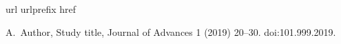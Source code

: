 \documentclass{article}
\begin{document}
\cite{bibkey1}


\begin{thebibliography}{1}
\expandafter\ifx\csname url\endcsname\relax
  \def\url#1{\texttt{#1}}\fi
\expandafter\ifx\csname urlprefix\endcsname\relax\def\urlprefix{URL }\fi
\expandafter\ifx\csname href\endcsname\relax
  \def\href#1#2{#2} \def\path#1{#1}\fi

A.~Author, Study title, Journal of Advances 1 (2019) 20--30.
\newblock \href {http://dx.doi.org/101.999.2019} {\path{doi:101.999.2019}}.

\end{thebibliography}
\end{document}
